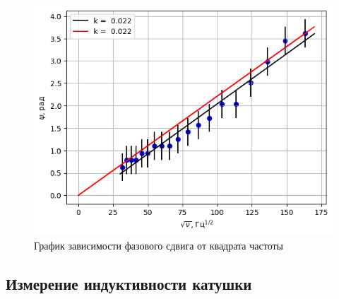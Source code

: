 \begin{figure}[h!]
    \centering 
    \includegraphics[width=12cm]{images/plot3.png}
    \caption{График зависимости фазового сдвига от квадрата частоты}
\end{figure}
\newpage 
\subsection*{Измерение индуктивности катушки}

